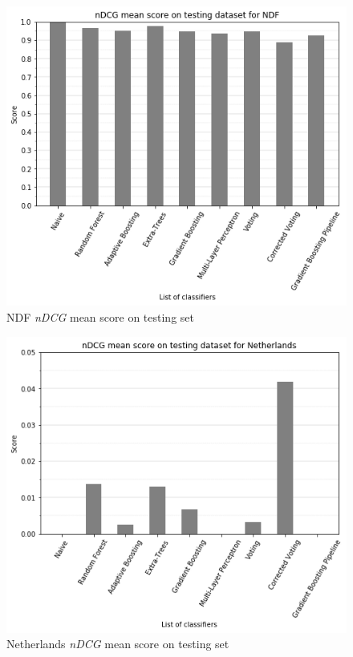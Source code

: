 \documentclass[twocolumn, switch]{article}
\begin{document}
\begin{figure}[H]
\centering
\includegraphics[scale=0.35]{../graphs/ndcg_mean_score_ndf_test}
\caption{NDF \textit{nDCG} mean score on testing set}
\label{fig:ndcgtestndf}
\end{figure}

\begin{figure}[H]
\centering
\includegraphics[scale=0.35]{../graphs/ndcg_mean_score_nl_test}
\caption{Netherlands \textit{nDCG} mean score on testing set}
\label{fig:ndcgtestnl}
\end{figure}
\end{document}
